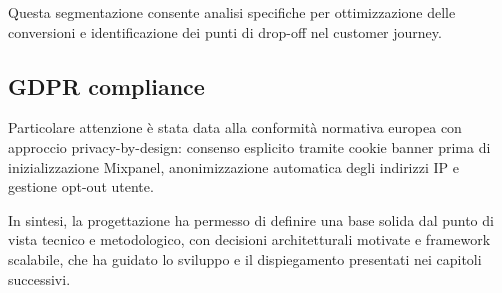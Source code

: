 Questa segmentazione consente analisi specifiche per ottimizzazione delle 
conversioni e identificazione dei punti di drop-off nel customer journey.

\subsection{GDPR compliance}
Particolare attenzione è stata data alla conformità normativa europea con 
approccio privacy-by-design: consenso esplicito tramite cookie banner prima 
di inizializzazione Mixpanel, anonimizzazione automatica degli indirizzi IP 
e gestione opt-out utente.

\bigskip
In sintesi, la progettazione ha permesso di definire una base solida dal punto di
vista tecnico e metodologico, con decisioni architetturali motivate e framework 
scalabile, che ha guidato lo sviluppo e il dispiegamento presentati nei capitoli 
successivi.
